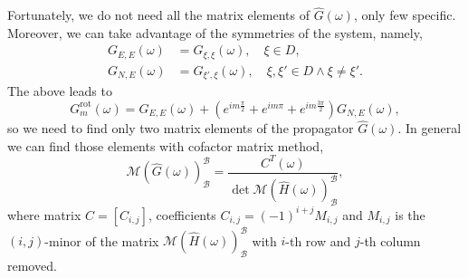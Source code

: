 \documentclass{article}
\begin{document}
Fortunately, we do not need all the matrix elements of $\hat{G}(\omega)$, only few specific. Moreover, we can take advantage of the symmetries of the system, namely,
\begin{align}
    G_{E, E}(\omega) &= G_{\xi, \xi}(\omega),
        \quad \xi \in D, \\
    G_{N, E}(\omega) &= G_{\xi', \xi}(\omega),
        \quad \xi, \xi' \in D \land \xi \neq \xi'.
\end{align}
The above leads to
\begin{equation}
    G^{\text{rot}}_{m}(\omega) = G_{E, E}(\omega) + 
    (e^{i m\frac{\pi}{2}} + e^{i m\pi} + e^{i m\frac{3\pi}{2}}) 
        G_{N, E}(\omega),
\end{equation}
so we need to find only two matrix elements of the propagator $\hat{G}(\omega)$. 
In general we can find those elements with cofactor matrix method,
\begin{equation}
    \mathcal{M}(\hat{G}(\omega))_\mathcal{B}^\mathcal{B} = 
    \frac{C^{T}(\omega)}{\det \mathcal{M}(\hat{H}(\omega))_\mathcal{B}^\mathcal{B}},
\end{equation}
where matrix $C = [C_{i,j}]$, coefficients $C_{i,j} = (-1)^{i+j}M_{i,j}$ and $M_{i,j}$ is the $(i,j)$-minor of the matrix $\mathcal{M}(\hat{H}(\omega))_\mathcal{B}^\mathcal{B}$ with $i$-th row and $j$-th column removed.
\end{document}
